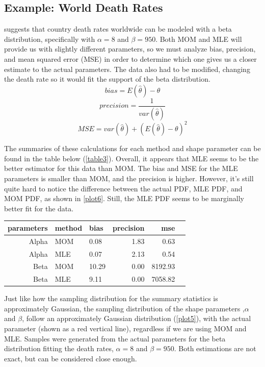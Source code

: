 \documentclass{article}\usepackage[]{graphicx}\usepackage[]{xcolor}
\newenvironment{Figure}
  {\par\medskip\noindent\minipage{\linewidth}}
  {\endminipage\par\medskip}
\begin{document}
\begin{multicols}{2}
\section{Example: World Death Rates}
\cite{labdata} suggests that country death rates worldwide can be modeled with a beta distribution, specifically with $\alpha = 8$ and $\beta = 950$. Both MOM and MLE will provide us with slightly different parameters, so we must analyze bias, precision, and mean squared error (MSE) in order to determine which one gives us a closer estimate to the actual parameters. The data also had to be modified, changing the death rate so it would fit the support of the beta distribution.
\[bias = E(\hat{\theta}) - \theta\]
\[precision = \frac{1}{var(\hat{\theta})}\]
\[MSE = var(\hat{\theta}) + (E(\hat{\theta}) - \theta)^2\]

\indent The summaries of these calculations for each method and shape parameter can be found in the table below (\autoref{table3}). Overall, it appears that MLE seems to be the better estimator for this data than MOM. The bias and MSE for the MLE parameters is smaller than MOM, and the precision is higher. However, it's still quite hard to notice the difference between the actual PDF, MLE PDF, and MOM PDF, as shown in \autoref{plot6}. Still, the MLE PDF seems to be marginally better fit for the data. 

\begin{Figure}
\centering
\begin{tabular}{rllrrr}
  \hline
 parameters & method & bias & precision & mse \\ 
  \hline
    Alpha & MOM & 0.08 & 1.83 & 0.63 \\ 
    Alpha & MLE & 0.07 & 2.13 & 0.54 \\ 
    Beta & MOM & 10.29 & 0.00 & 8192.93 \\ 
    Beta & MLE & 9.11 & 0.00 & 7058.82 \\ 
   \hline
\end{tabular}
\label{table3}
\end{Figure}
\indent Just like how the sampling distribution for the summary statistics is approximately Gaussian, the sampling distribution of the shape parameters ,$\alpha$ and $\beta$, follow an approximately Gaussian distribution (\autoref{plot5}), with the actual parameter (shown as a red vertical line), regardless if we are using MOM and MLE. Samples were generated from the actual parameters for the beta distribution fitting the death rates, $\alpha = 8$ and $\beta = 950$. Both estimations are not exact, but can be considered close enough. 

\vspace{2em}

\begin{tiny}

\end{tiny}
\end{multicols}
\end{document}
